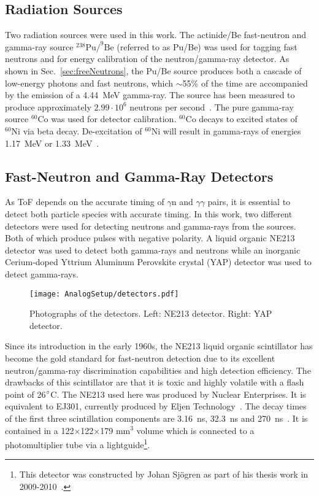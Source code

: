 \documentclass[main.tex]{subfiles}
\begin{document}
\subsection{Radiation Sources}
Two radiation sources were used in this work. The actinide/Be fast-neutron and gamma-ray source $^\text{238}\text{Pu}/^\text{9}\text{Be}$ (referred to as Pu/Be) was used for tagging fast neutrons and for energy calibration of the neutron/gamma-ray detector. As shown in Sec.~\ref{sec:freeNeutrons}, the Pu/Be source produces both a cascade of low-energy photons and fast neutrons, which $\sim$55\% of the time are accompanied by the emission of a \SI{4.44}{\MeV} gamma-ray. The source has been measured to produce approximately $\text{2.99}\cdot\text{10}^\text{6}$ neutrons per second~\cite{Scherzinger:2017}. The pure gamma-ray source $^\text{60}\text{Co}$ was used for detector calibration. $^\text{60}\text{Co}$ decays to excited states of $^\text{60}\text{Ni}$ via beta decay. De-excitation of $^\text{60}\text{Ni}$ will result in gamma-rays of energies \SI{1.17}{MeV} or \SI{1.33}{MeV}~\cite{Nudat}.



\subsection{Fast-Neutron and Gamma-Ray Detectors}
As ToF depends on the accurate timing of $\gamma$n and $\gamma\gamma$ pairs, it is essential to detect both particle species with accurate timing. In this work, two different detectors were used for detecting neutrons and gamma-rays from the sources. Both of which produce pulses with negative polarity. A liquid organic NE213 detector was used to detect both gamma-rays and neutrons while an inorganic Cerium-doped Yttrium Aluminum Perovskite crystal (YAP) detector was used to detect gamma-rays. 

\begin{figure}[h]
    \centering
        \texttt{[image: AnalogSetup/detectors.pdf]}
        \caption[Photographs of the detectors.]{Photographs of the detectors. Left: NE213 detector. Right: YAP detector.}
    \label{fig:detectors}
\end{figure}

Since its introduction in the early 1960s, the NE213 liquid organic scintillator has become the gold standard for fast-neutron detection due to its excellent neutron/gamma-ray discrimination capabilities and high detection efficiency. 
The drawbacks of this scintillator are that it is toxic and highly volatile with a flash point of 26$\text{\degree}$C. The NE213 used here was produced by Nuclear Enterprises. It is equivalent to EJ301, currently produced by Eljen Technology~\cite{Eljen}. The decay times of the first three scintillation components are \SI{3.16}{ns}, \SI{32.3}{ns} and \SI{270}{ns}~\cite{Eljen}. It is contained in a 122$\times$122$\times$179 \si{\mm}$^\text{3}$ volume which is connected to a photomultiplier tube via a lightguide\footnote{This detector was constructed by Johan Sjögren as part of his thesis work in 2009-2010~\cite{sjogren}.}.
\end{document}
